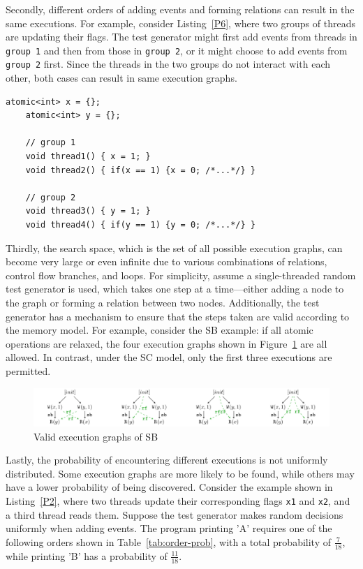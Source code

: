 Secondly, different orders of adding events and forming relations can result in the same executions. For example, consider Listing~\ref{P6}, where two groups of threads are updating their flags. The test generator might first add events from threads in \texttt{group 1} and then from those in \texttt{group 2}, or it might choose to add events from \texttt{group 2} first. Since the threads in the two groups do not interact with each other, both cases can result in same execution graphs.


\begin{lstlisting}[caption={P6}, label={P6}]
    atomic<int> x = {}; 
    atomic<int> y = {}; 
    
    // group 1
    void thread1() { x = 1; }
    void thread2() { if(x == 1) {x = 0; /*...*/} }

    // group 2
    void thread3() { y = 1; }
    void thread4() { if(y == 1) {y = 0; /*...*/} }

\end{lstlisting}


Thirdly, the search space, which is the set of all possible execution graphs, can become very large or even infinite due to various combinations of relations, control flow branches, and loops. For simplicity, assume a single-threaded random test generator is used, which takes one step at a time—either adding a node to the graph or forming a relation between two nodes. Additionally, the test generator has a mechanism to ensure that the steps taken are valid according to the memory model. For example, consider the SB example: if all atomic operations are relaxed, the four execution graphs shown in Figure~\ref{SB4} are all allowed. In contrast, under the SC model, only the first three executions are permitted.


\begin{figure}[h!tbp]  
    \centering
    \includegraphics[scale=0.8]{figure/exec-graph/SB4.pdf}   
    \caption{Valid execution graphs of SB}  
    \label{SB4}  
\end{figure}



Lastly, the probability of encountering different executions is not uniformly distributed. Some execution graphs are more likely to be found, while others may have a lower probability of being discovered. Consider the example shown in Listing~\ref{P2}, where two threads update their corresponding flags \texttt{x1} and \texttt{x2}, and a third thread reads them. Suppose the test generator makes random decisions uniformly when adding events. The program printing 'A' requires one of the following orders shown in Table~\ref{tab:order-prob}, with a total probability of $\frac{7}{18}$, while printing 'B' has a probability of $\frac{11}{18}$.



